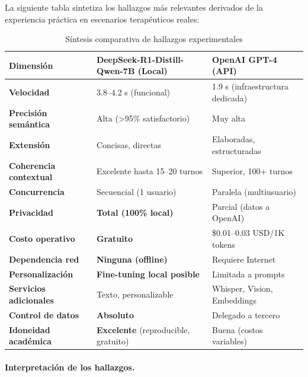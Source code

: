 \documentclass[12pt,a4paper]{report}
\numberwithin{figure}{section}
\begin{document}
La siguiente tabla sintetiza los hallazgos más relevantes derivados de la experiencia práctica en escenarios terapéuticos reales:

\begin{table}[h!]
\centering
\caption{Síntesis comparativa de hallazgos experimentales}
\renewcommand{\arraystretch}{1.3}
\begin{tabular}{@{}p{3.5cm}p{5.5cm}p{5cm}@{}}
\toprule
\textbf{Dimensión} & \textbf{DeepSeek-R1-Distill-Qwen-7B (Local)} & \textbf{OpenAI GPT-4 (API)} \\
\midrule
\textbf{Velocidad} & 3.8--4.2 s (funcional) & 1.9 s (infraestructura dedicada) \\
\midrule
\textbf{Precisión semántica} & Alta (>95\% satisfactorio) & Muy alta \\
\midrule
\textbf{Extensión} & Concisas, directas & Elaboradas, estructuradas \\
\midrule
\textbf{Coherencia contextual} & Excelente hasta 15--20 turnos & Superior, 100+ turnos \\
\midrule
\textbf{Concurrencia} & Secuencial (1 usuario) & Paralela (multiusuario) \\
\midrule
\textbf{Privacidad} & \textbf{Total (100\% local)} & Parcial (datos a OpenAI) \\
\midrule
\textbf{Costo operativo} & \textbf{Gratuito} & \$0.01--0.03 USD/1K tokens \\
\midrule
\textbf{Dependencia red} & \textbf{Ninguna (offline)} & Requiere Internet \\
\midrule
\textbf{Personalización} & \textbf{Fine-tuning local posible} & Limitada a prompts \\
\midrule
\textbf{Servicios adicionales} & Texto, personalizable & Whisper, Vision, Embeddings \\
\midrule
\textbf{Control de datos} & \textbf{Absoluto} & Delegado a tercero \\
\midrule
\textbf{Idoneidad académica} & \textbf{Excelente} (reproducible, gratuito) & Buena (costos variables) \\
\bottomrule
\end{tabular}
\end{table}

\vspace{1em}

\paragraph{Interpretación de los hallazgos.}
\end{document}
